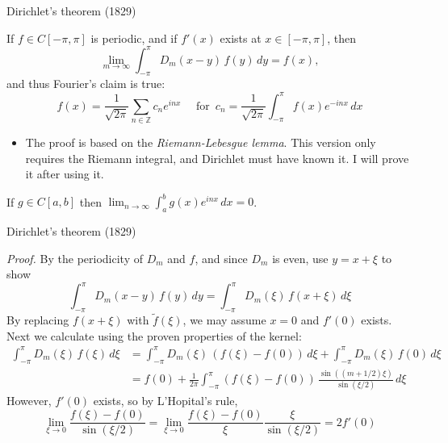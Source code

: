 \documentclass[10pt,
               svgnames,
               hyperref={colorlinks,
                         citecolor=DeepPink4,
                         linkcolor=FireBrick,
                         urlcolor=blue},
               usepdftitle=false]{beamer}
\newcommand{\ZZ}{\mathbb{Z}}
\newcommand{\ds}{\displaystyle}
\begin{document}
\begin{frame}{Dirichlet's theorem (1829)}

\begin{theorem}
If $f\in C[-\pi,\pi]$ is periodic, and if $f'(x)$ exists at $x\in[-\pi,\pi]$, then
    $$\lim_{m\to\infty} \int_{-\pi}^\pi D_m(x-y)\, f(y)\,dy = f(x),$$
and thus Fourier's claim is true:
{\small
$$f(x) = \frac{1}{\sqrt{2\pi}} \sum_{n\in\ZZ} c_n e^{inx} \quad \text{ for }\, c_n =\frac{1}{\sqrt{2\pi}} \int_{-\pi}^\pi f(x) e^{-inx}\,dx$$
}
\end{theorem}

\begin{itemize}
\item The proof is based on the \emph{Riemann-Lebesgue lemma}.  This version only requires the Riemann integral, and Dirichlet must have known it.  I will prove it after using it.
\end{itemize}

\begin{lemma}
If $g \in C[a,b]$ then $\ds \lim_{n\to\infty} \int_a^b g(x) e^{inx}\,dx = 0$.
\end{lemma}
\end{frame}


\begin{frame}{Dirichlet's theorem (1829)}

{\small
\noindent \emph{Proof.}  By the periodicity of $D_m$ and $f$, and since $D_m$ is even, use $y=x+\xi$ to show
    $$\int_{-\pi}^\pi D_m(x-y)\, f(y)\,dy = \int_{-\pi}^\pi D_m(\xi)\, f(x+\xi)\,d\xi$$
By replacing $f(x+\xi)$ with $\tilde f(\xi)$, we may assume $x=0$ and $f'(0)$ exists.  Next we calculate using the proven properties of the kernel:
\begin{align*}
\int_{-\pi}^\pi D_m(\xi)\, f(\xi)\,d\xi &= \int_{-\pi}^\pi D_m(\xi)\, \left(f(\xi) - f(0)\right)\,d\xi + \int_{-\pi}^\pi D_m(\xi)\, f(0)\,d\xi \\
  &= f(0) + \frac{1}{2\pi} \int_{-\pi}^\pi \left(f(\xi) - f(0)\right)\,\frac{\sin((m+1/2)\xi)}{\sin(\xi/2)}\,d\xi
\end{align*}
However, $f'(0)$ exists, so by L'Hopital's rule,
	$$\lim_{\xi\to 0} \frac{f(\xi) - f(0)}{\sin(\xi/2)} = \lim_{\xi\to 0} \frac{f(\xi) - f(0)}{\xi} \frac{\xi}{\sin(\xi/2)} = 2 f'(0)$$
}
\end{frame}
\end{document}
